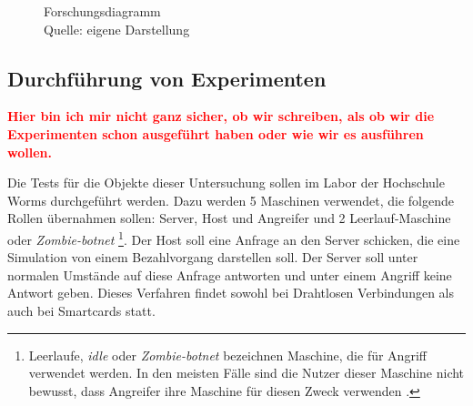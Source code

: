 \begin{figure}[H]
  \caption{Forschungsdiagramm
  \\ Quelle: eigene Darstellung}
  \label{fig:FD}
\end{figure}



\newpage



\subsection{Durchführung von Experimenten}
\textcolor{red}{\textbf{Hier bin ich mir nicht ganz sicher, ob wir schreiben, als ob wir die Experimenten 
schon ausgeführt haben oder wie wir es ausführen wollen.}}

Die Tests für die Objekte dieser Untersuchung sollen im Labor der Hochschule Worms durchgeführt werden. 
Dazu werden 5 Maschinen verwendet, die folgende Rollen übernahmen sollen: Server, Host und Angreifer und 2
Leerlauf-Maschine oder \textit{Zombie-botnet} \footnote{Leerlaufe, \textit{idle} oder \textit{Zombie-botnet} 
bezeichnen Maschine, die für Angriff verwendet werden. In den meisten Fälle sind die Nutzer dieser Maschine nicht
bewusst, dass Angreifer ihre Maschine für diesen Zweck verwenden \cite{refart:XGDD}.}. Der Host soll eine 
Anfrage an den Server schicken, die eine Simulation von einem Bezahlvorgang darstellen soll. Der Server 
soll unter normalen Umstände auf diese Anfrage antworten und unter einem Angriff keine Antwort geben.
Dieses Verfahren findet sowohl bei Drahtlosen Verbindungen als auch bei Smartcards statt.


